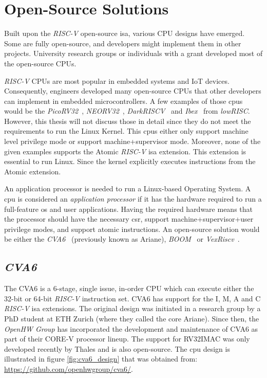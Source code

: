 \section{Open-Source Solutions}
\label{section:open_source_solutions}
Built upon the \textit{RISC-V} open-source \acrlong{isa}, various CPU designs have emerged. Some are fully open-source, and developers might implement them in other projects. University research groups or individuals with a grant developed most of the open-source CPUs.

\textit{RISC-V} CPUs are most popular in embedded systems and IoT devices. Consequently, engineers developed many open-source CPUs that other developers can implement in embedded microcontrollers. A few examples of those \acrshort{cpu}s would be the \textit{PicoRV32}~\cite{picorv32}, \textit{NEORV32}~\cite{neorv32}, \textit{DarkRISCV}~\cite{darkriscv} and \textit{Ibex}~\cite{ibex} from \textit{lowRISC}. However, this thesis will not discuss those in detail since they do not meet the requirements to run the Linux Kernel. This \acrshort{cpu}s either only support \acrfull{machine} level privilege mode or support \acrfull{machine}+\acrfull{supervisor} mode. Moreover, none of the given examples supports the Atomic \textit{RISC-V} \acrshort{isa} extension. This extension is essential to run Linux. Since the kernel explicitly executes instructions from the Atomic extension.

An application processor is needed to run a Linux-based Operating System. A \acrshort{cpu} is considered an \textit{application processor} if it has the hardware required to run a full-feature \acrfull{os} and user applications. Having the required hardware means that the processor should have the necessary \acrfull{csr}, support \acrshort{machine}+\acrshort{supervisor}+\acrshort{user} privilege modes, and support atomic instructions. An open-source solution would be either the \textit{CVA6}~\cite{zaruba2019cost} (previously known as Ariane), \textit{BOOM}~\cite{zhaosonicboom} or \textit{VexRiscv}~\cite{vexriscv}.

\subsection{\textit{CVA6}}
The CVA6 is a 6-stage, single issue, in-order CPU which can execute either the 32-bit or 64-bit \textit{RISC-V} instruction set. CVA6 has support for the I, M, A and C \textit{RISC-V} \acrshort{isa} extensions. The original design was initiated in a research group by a PhD student at ETH Zurich (where they called the core Ariane). Since then, the \textit{OpenHW Group} has incorporated the development and maintenance of CVA6 as part of their CORE-V processor lineup. The support for RV32IMAC was only developed recently by Thales and is also open-source. The \acrshort{cpu} design is illustrated in figure \ref{fig:cva6_design} that was obtained from: \url{https://github.com/openhwgroup/cva6/}.

